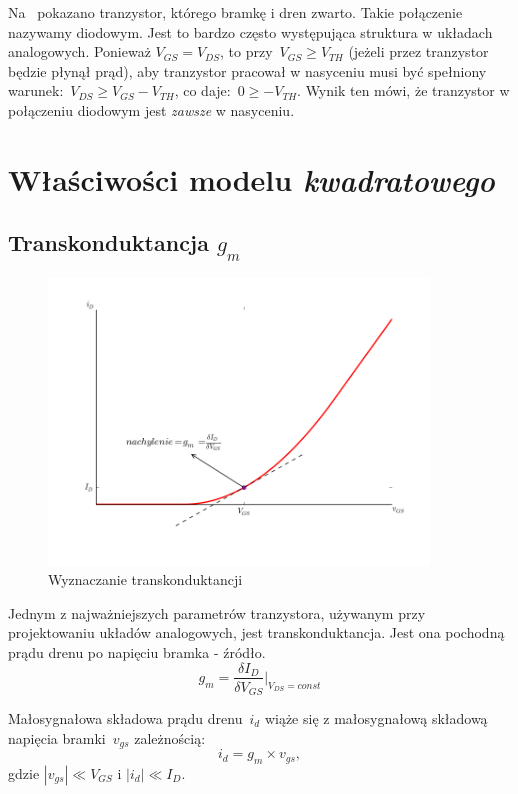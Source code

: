 \documentclass[twoside,pl,final]{labman}
\begin{document}
Na~ pokazano tranzystor, którego bramkę i dren zwarto.
Takie połączenie nazywamy diodowym.
Jest to bardzo często występująca struktura w układach analogowych.
Ponieważ $V_{GS} = V_{DS}$, to przy~$V_{GS} \geq V_{TH}$
(jeżeli przez tranzystor będzie płynął prąd),
aby tranzystor pracował w nasyceniu musi być spełniony warunek:~$V_{DS} \geq V_{GS} - V_{TH}$,
co daje:~$0 \geq -V_{TH}$.
Wynik ten mówi, że tranzystor w połączeniu diodowym
jest \emph{zawsze} w nasyceniu.

\FloatBarrier
\section{Właściwości modelu \emph{kwadratowego}}
\subsection{Transkonduktancja $g_m$}
\label{model:squarelaw:gm}

\begin{figure}[!htbp]
  \centering
  \includegraphics[width=0.9\textwidth]{gm}
  \caption{Wyznaczanie transkonduktancji}
  \label{fig:squarelaw:gm}
\end{figure}

Jednym z najważniejszych parametrów tranzystora,
używanym przy projektowaniu układów analogowych,
jest transkonduktancja.
Jest ona pochodną prądu drenu po napięciu bramka - źródło.
\begin{equation}
  g_m = \frac{\delta I_D}{\delta V_{GS}} \Bigg\vert_{V_{DS} = const}
  \label{eqn:squarelaw:gm:deriv}
\end{equation}

Małosygnałowa składowa prądu drenu~$i_d$ wiąże się z małosygnałową składową
napięcia bramki~$v_{gs}$ zależnością:
\begin{equation}
  i_d = g_m \times v_{gs},
  \label{eqn:squarelaw:trans}
\end{equation}
gdzie  $|v_{gs}| \ll V_{GS}$ i $|i_d| \ll I_D$.
\end{document}
